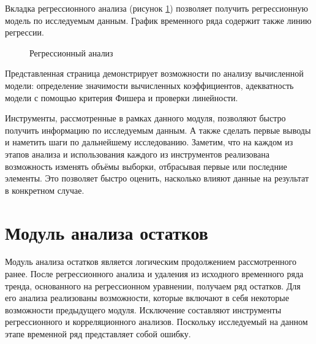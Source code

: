 Вкладка регрессионного анализа (рисунок \ref{img:mod_regr}) позволяет получить регрессионную модель по исследуемым данным. График временного ряда содержит также линию регрессии.
\begin{figure}[ht]
\caption{Регрессионный анализ}
\label{img:mod_regr}
\end{figure}
Представленная страница демонстрирует возможности по анализу вычисленной модели: определение значимости вычисленных коэффициентов, адекватность модели с помощью критерия Фишера и проверки линейности.

Инструменты, рассмотренные в рамках данного модуля, позволяют быстро получить информацию по исследуемым данным. А также сделать первые выводы и наметить шаги по дальнейшему исследованию. Заметим, что на каждом из этапов анализа и использования каждого из инструментов реализована возможность изменять объёмы выборки, отбрасывая первые или последние элементы. Это позволяет быстро оценить, насколько влияют данные на результат в конкретном случае.


\section{Модуль анализа остатков} %
\label{sec:mod_residuals}

Модуль анализа остатков является логическим продолжением рассмотренного ранее. После регрессионного анализа и удаления из исходного временного ряда тренда, основанного на регрессионном уравнении, получаем ряд остатков. Для его анализа реализованы возможности, которые включают в себя некоторые возможности предыдущего модуля. Исключение составляют инструменты регрессионного и корреляционного анализов. Поскольку исследуемый на данном этапе временной ряд представляет собой ошибку.

